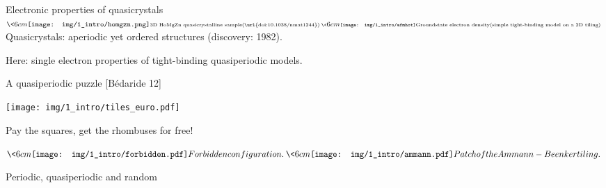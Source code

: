 \begin{frame}{Electronic properties of quasicrystals}
\(
	\<{6cm}
		\centering
		\texttt{[image: img/1\_intro/homgzn.png]}
		
		\ss{3D HoMgZn quasicrystalline sample} \ss{(\url{doi:10.1038/nmat1244})}
	\>
	\<{6cm}
		\centering
		\texttt{[image: img/1\_intro/afmhot]}
		
		\ss{Groundstate electron density} \ss{(simple tight-binding model on a 2D tiling)}
	\>
\)
Quasicrystals: aperiodic yet ordered structures (discovery: 1982).

Here: single electron properties of tight-binding quasiperiodic models.
\end{frame}

\begin{frame}{A quasiperiodic puzzle [Bédaride \etal{} 12]}

\centering
\texttt{[image: img/1\_intro/tiles\_euro.pdf]}

Pay the squares, get the rhombuses for free!

\(
\<{6cm}
\centering
\texttt{[image: img/1\_intro/forbidden.pdf]}

Forbidden configuration.
\>

\<{6cm}
\centering
\texttt{[image: img/1\_intro/ammann.pdf]}

Patch of the Ammann-Beenker tiling.
\>
\)
\end{frame}

\begin{frame}{Periodic, quasiperiodic and random}



\centering
{}


\end{frame}

